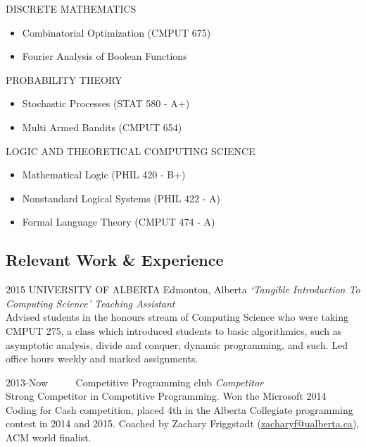 \documentclass{friggeri-cv} %
\begin{document}
\begin{entrylist}
\entries
{DISCRETE MATHEMATICS}
{
\begin{itemize}
    \setlength\itemsep{-1em}
    \item Combinatorial Optimization (CMPUT 675)\\
    \item Fourier Analysis of Boolean Functions
\end{itemize}
}


\entries
{PROBABILITY THEORY}
{
\begin{itemize}
    \setlength\itemsep{-1em}
    \item Stochastic Processes (STAT 580 - A+)\\
    \item Multi Armed Bandits (CMPUT 654)
\end{itemize}
}


\entries
{LOGIC AND THEORETICAL COMPUTING SCIENCE}
{
\begin{itemize}
    \setlength\itemsep{-1em}
    \item Mathematical Logic (PHIL 420 - B+)\\
    \item Nonstandard Logical Systems (PHIL 422 - A)\\
    \item Formal Language Theory (CMPUT 474 - A)
\end{itemize}
}


\end{entrylist}

\pagebreak[2]
\subsection{Relevant Work \& Experience}

\begin{entrylist}

\entry
{2015}
{UNIVERSITY OF ALBERTA}
{Edmonton, Alberta}
{\emph{`Tangible Introduction To Computing Science' Teaching Assistant} \\
Advised students in the honours stream of Computing Science who were taking CMPUT 275, a class which introduced students to basic algorithmics, such as asymptotic analysis, divide and conquer, dynamic programming, and such. Led office hours weekly and marked assignments.}


\entry
{2013-Now\ \ \ \ \ }
{Competitive Programming club}
{}
{\emph{Competitor} \\
Strong Competitor in Competitive Programming. Won the Microsoft 2014 Coding for Cash competition, placed 4th in the Alberta Collegiate programming contest in 2014 and 2015. Coached by Zachary Friggstadt (\href{mailto:zacharyf@ualberta.ca}{zacharyf@ualberta.ca}), ACM world finalist.}

\end{entrylist}
\end{document}
